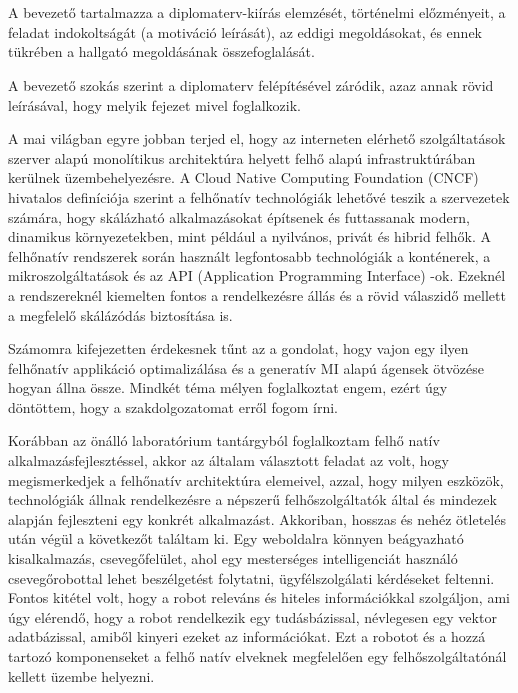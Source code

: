 \chapter{\bevezetes}

A bevezető tartalmazza a diplomaterv-kiírás elemzését, történelmi előzményeit, a feladat indokoltságát (a motiváció leírását), az eddigi megoldásokat, és ennek tükrében a hallgató megoldásának összefoglalását.

A bevezető szokás szerint a diplomaterv felépítésével záródik, azaz annak rövid leírásával, hogy melyik fejezet mivel foglalkozik.

A mai világban egyre jobban terjed el, hogy az interneten elérhető szolgáltatások
 szerver alapú monolítikus architektúra helyett felhő alapú 
 infrastruktúrában kerülnek üzembehelyezésre.
 A Cloud Native Computing Foundation (CNCF) hivatalos definíciója \cite{CNCF} szerint
 a felhőnatív technológiák lehetővé teszik a szervezetek számára, hogy 
 skálázható alkalmazásokat  építsenek és futtassanak modern, dinamikus
 környezetekben, mint például a nyilvános, privát és hibrid felhők.
 A felhőnatív rendszerek során használt legfontosabb technológiák a konténerek, 
 a mikroszolgáltatások és az API (Application Programming Interface) -ok.
 Ezeknél a rendszereknél kiemelten fontos a rendelkezésre állás 
 és a rövid válaszidő mellett a megfelelő skálázódás biztosítása is.

 Számomra kifejezetten érdekesnek tűnt az a gondolat, hogy vajon egy ilyen felhőnatív
 applikáció optimalizálása és a generatív MI alapú ágensek ötvözése hogyan állna össze.
 Mindkét téma mélyen foglalkoztat engem, ezért úgy döntöttem, hogy a szakdolgozatomat erről fogom írni.

 Korábban az önálló laboratórium tantárgyból foglalkoztam felhő natív alkalmazásfejlesztéssel,
 akkor az általam választott feladat az volt, hogy megismerkedjek a felhőnatív architektúra 
 elemeivel, azzal, hogy milyen eszközök, technológiák állnak rendelkezésre a népszerű felhőszolgáltatók 
 által és mindezek alapján fejleszteni egy konkrét alkalmazást.
 Akkoriban, hosszas és nehéz ötletelés után végül a következőt találtam ki.
 Egy weboldalra könnyen beágyazható kisalkalmazás, 
 csevegőfelület, ahol egy mesterséges intelligenciát használó csevegőrobottal lehet 
 beszélgetést folytatni, ügyfélszolgálati kérdéseket feltenni. Fontos kitétel volt,
 hogy a robot releváns és hiteles információkkal szolgáljon, ami úgy elérendő,
 hogy a robot rendelkezik egy tudásbázissal, névlegesen egy vektor adatbázissal,
 amiből kinyeri ezeket az információkat.
 Ezt a robotot és a hozzá tartozó komponenseket a felhő natív elveknek megfelelően egy
 felhőszolgáltatónál kellett üzembe helyezni.


